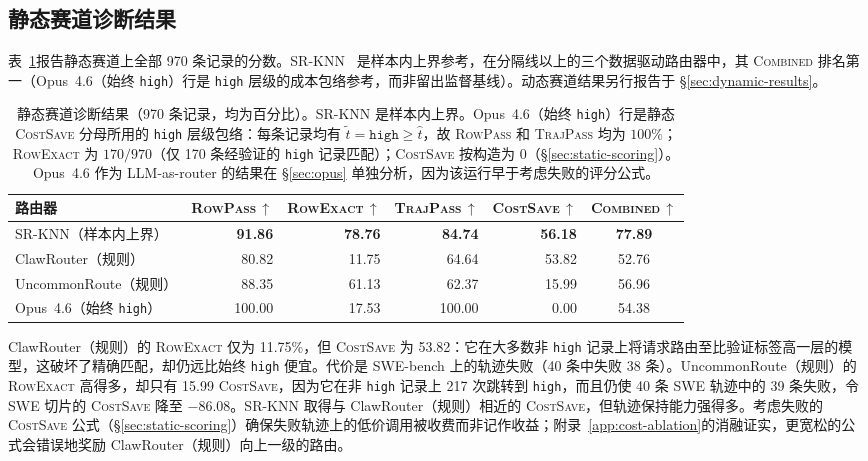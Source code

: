 \subsection{静态赛道诊断结果}
\label{sec:main-results}

表~\ref{tab:main-results}报告静态赛道上全部 970 条记录的分数。SR-KNN~\citep{liu2026vllmsemanticrouter} 是样本内上界参考，在分隔线以上的三个数据驱动路由器中，其 \textsc{Combined} 排名第一（Opus~4.6（始终 \texttt{high}）行是 \texttt{high} 层级的成本包络参考，而非留出监督基线）。动态赛道结果另行报告于 \S\ref{sec:dynamic-results}。

\begin{table}[t]
\centering
\small
\begin{adjustbox}{max width=\linewidth}
\begin{tabular}{lrrrrc}
\toprule
路由器 & \textsc{RowPass}\,$\uparrow$ & \textsc{RowExact}\,$\uparrow$ & \textsc{TrajPass}\,$\uparrow$ & \textsc{CostSave}\,$\uparrow$ & \textbf{\textsc{Combined}}\,$\uparrow$ \\
\midrule
SR-KNN（样本内上界）       & \textbf{91.86} & \textbf{78.76} & \textbf{84.74} & \textbf{56.18} & \textbf{77.89} \\
ClawRouter（规则）      & 80.82 & 11.75 & 64.64 & 53.82 & 52.76 \\
UncommonRoute（规则）   & 88.35 & 61.13 & 62.37 & 15.99 & 56.96 \\
\midrule
Opus~4.6（始终 \texttt{high}） & 100.00 & 17.53 & 100.00 & 0.00 & 54.38 \\
\bottomrule
\end{tabular}
\end{adjustbox}
\caption{静态赛道诊断结果（970 条记录，均为百分比）。SR-KNN 是样本内上界。Opus~4.6（始终 \texttt{high}）行是静态 \textsc{CostSave} 分母所用的 \texttt{high} 层级包络：每条记录均有 $\tilde{t}=\texttt{high}\ge\hat{t}$，故 \textsc{RowPass} 和 \textsc{TrajPass} 均为 $100\%$；\textsc{RowExact} 为 $170/970$（仅 170 条经验证的 \texttt{high} 记录匹配）；\textsc{CostSave} 按构造为 $0$（\S\ref{sec:static-scoring}）。Opus~4.6 作为 LLM-as-router 的结果在 \S\ref{sec:opus} 单独分析，因为该运行早于考虑失败的评分公式。}
\label{tab:main-results}
\end{table}

ClawRouter（规则）的 \textsc{RowExact} 仅为 11.75\%，但 \textsc{CostSave} 为 53.82：它在大多数非 \texttt{high} 记录上将请求路由至比验证标签高一层的模型，这破坏了精确匹配，却仍远比始终 \texttt{high} 便宜。代价是 SWE-bench 上的轨迹失败（40 条中失败 38 条）。UncommonRoute（规则）的 \textsc{RowExact} 高得多，却只有 15.99 \textsc{CostSave}，因为它在非 \texttt{high} 记录上 217 次跳转到 \texttt{high}，而且仍使 40 条 SWE 轨迹中的 39 条失败，令 SWE 切片的 \textsc{CostSave} 降至 $-86.08$。SR-KNN 取得与 ClawRouter（规则）相近的 \textsc{CostSave}，但轨迹保持能力强得多。考虑失败的 \textsc{CostSave} 公式（\S\ref{sec:static-scoring}）确保失败轨迹上的低价调用被收费而非记作收益；附录~\ref{app:cost-ablation}的消融证实，更宽松的公式会错误地奖励 ClawRouter（规则）向上一级的路由。


